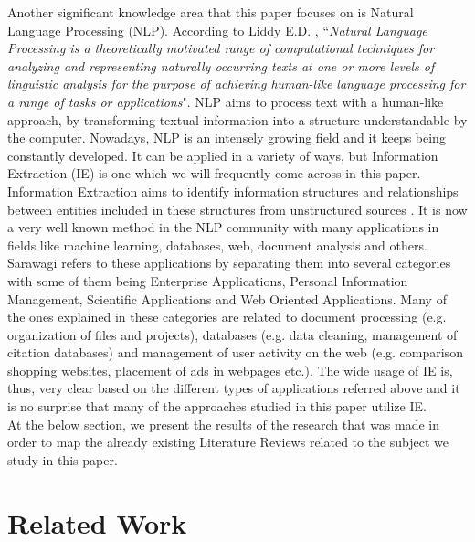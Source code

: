 Another significant knowledge area that this paper focuses on is Natural Language Processing (NLP). According to Liddy E.D. \cite{liddy2001natural}, ``\emph{Natural Language Processing is a theoretically motivated 
range of computational techniques for analyzing and representing naturally occurring texts at one or more levels of linguistic analysis for the purpose of achieving human-like language processing for a 
range of tasks or applications}". NLP aims to process text with a human-like approach, by transforming textual information into a structure understandable by the computer. Nowadays, NLP is an intensely growing 
field and it keeps being constantly developed. It can be applied in a variety of ways, but Information Extraction (IE) is one which we will frequently come across in this paper. \\

Information Extraction aims to identify information structures and relationships between entities included in these structures from unstructured sources \cite{infoextraction}. It is now a very well known 
method in the NLP community with many applications in fields like machine learning, databases, web, document analysis and others. Sarawagi \cite{infoextraction} refers to these applications by separating them 
into several categories with some of them being Enterprise Applications, Personal Information Management, Scientific Applications and Web Oriented Applications. Many of the ones explained in these categories 
are related to document processing (e.g. organization of files and projects), databases (e.g. data cleaning, management of citation databases) and management of user activity on the web (e.g. comparison shopping 
websites, placement of ads in webpages etc.). The wide usage of IE is, thus, very clear based on the different types of applications referred above and it is no surprise that many of the approaches studied in 
this paper utilize IE. \\

At the below section, we present the results of the research that was made in order to map the already existing Literature Reviews related to the subject we study in this paper.

\section{Related Work}

